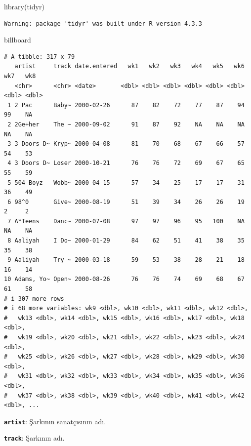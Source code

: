 \documentclass[
  letterpaper,
  DIV=11,
  numbers=noendperiod]{scrreprt}
\newenvironment{Shaded}{\begin{snugshade}}{\end{snugshade}}
\newcommand{\FunctionTok}[1]{\textcolor[rgb]{0.28,0.35,0.67}{#1}}
\newcommand{\NormalTok}[1]{\textcolor[rgb]{0.00,0.23,0.31}{#1}}
\begin{document}
\begin{Shaded}
\begin{Highlighting}[]
\FunctionTok{library}\NormalTok{(tidyr)}
\end{Highlighting}
\end{Shaded}

\begin{verbatim}
Warning: package 'tidyr' was built under R version 4.3.3
\end{verbatim}

\begin{Shaded}
\begin{Highlighting}[]
\NormalTok{billboard}
\end{Highlighting}
\end{Shaded}

\begin{verbatim}
# A tibble: 317 x 79
   artist     track date.entered   wk1   wk2   wk3   wk4   wk5   wk6   wk7   wk8
   <chr>      <chr> <date>       <dbl> <dbl> <dbl> <dbl> <dbl> <dbl> <dbl> <dbl>
 1 2 Pac      Baby~ 2000-02-26      87    82    72    77    87    94    99    NA
 2 2Ge+her    The ~ 2000-09-02      91    87    92    NA    NA    NA    NA    NA
 3 3 Doors D~ Kryp~ 2000-04-08      81    70    68    67    66    57    54    53
 4 3 Doors D~ Loser 2000-10-21      76    76    72    69    67    65    55    59
 5 504 Boyz   Wobb~ 2000-04-15      57    34    25    17    17    31    36    49
 6 98^0       Give~ 2000-08-19      51    39    34    26    26    19     2     2
 7 A*Teens    Danc~ 2000-07-08      97    97    96    95   100    NA    NA    NA
 8 Aaliyah    I Do~ 2000-01-29      84    62    51    41    38    35    35    38
 9 Aaliyah    Try ~ 2000-03-18      59    53    38    28    21    18    16    14
10 Adams, Yo~ Open~ 2000-08-26      76    76    74    69    68    67    61    58
# i 307 more rows
# i 68 more variables: wk9 <dbl>, wk10 <dbl>, wk11 <dbl>, wk12 <dbl>,
#   wk13 <dbl>, wk14 <dbl>, wk15 <dbl>, wk16 <dbl>, wk17 <dbl>, wk18 <dbl>,
#   wk19 <dbl>, wk20 <dbl>, wk21 <dbl>, wk22 <dbl>, wk23 <dbl>, wk24 <dbl>,
#   wk25 <dbl>, wk26 <dbl>, wk27 <dbl>, wk28 <dbl>, wk29 <dbl>, wk30 <dbl>,
#   wk31 <dbl>, wk32 <dbl>, wk33 <dbl>, wk34 <dbl>, wk35 <dbl>, wk36 <dbl>,
#   wk37 <dbl>, wk38 <dbl>, wk39 <dbl>, wk40 <dbl>, wk41 <dbl>, wk42 <dbl>, ...
\end{verbatim}

\textbf{\texttt{artist}}: Şarkının sanatçısının adı.

\textbf{\texttt{track}}: Şarkının adı.
\end{document}
